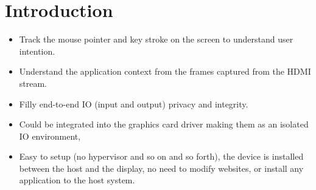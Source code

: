 \section{Introduction}
\label{sec:intro}

\begin{itemize}
  \item Track the mouse pointer and key stroke on the screen to understand user intention.
  \item Understand the application context from the frames captured from the HDMI stream.
  \item Filly end-to-end IO (input and output) privacy and integrity.
  \item Could be integrated into the graphics card driver making them as an isolated IO environment,
  \item Easy to setup (no hypervisor and so on and so forth), the device is installed between the host and the display, no need to modify websites, or install any application to the host system.
\end{itemize}